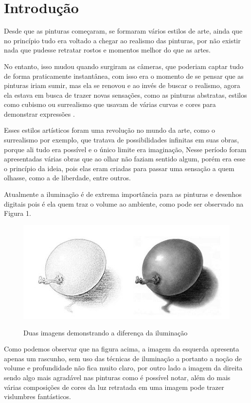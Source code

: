 \chapter {Introdução}
\label{cap:01}

Desde que as pinturas começaram, se formaram vários estilos de arte, ainda que no princípio tudo era voltado a chegar ao realismo das pinturas, por não existir nada que pudesse retratar rostos e momentos melhor do que as artes.

No entanto, isso mudou quando surgiram as câmeras, que poderiam captar tudo de forma praticamente instantânea, com isso era o momento de se pensar que as pinturas iriam sumir, mas ela se renovou e ao invés de buscar o realismo, agora ela estava em busca de trazer novas sensações, como as pinturas abstratas, estilos como cubismo ou surrealismo que usavam de várias curvas e cores para demonstrar expressões \cite{debora_2021}.

Esses estilos artísticos foram uma revolução no mundo da arte, como o surrealismo por exemplo, que tratava de possibilidades infinitas em suas obras, porque ali tudo era possível e o único limite era imaginação, Nesse período foram apresentadas várias obras que ao olhar não faziam sentido algum, porém era esse o princípio da ideia, pois elas eram criadas para passar uma sensação a quem olhasse, como a de liberdade, entre outros.

Atualmente a iluminação é de extrema importância para as  pinturas e desenhos digitais pois é ela quem traz o volume ao ambiente, como pode ser observado na Figura 1.

\begin{figure}[h]
	\caption{Duas imagens demonstrando a diferença da iluminação }
	\centering
	\includegraphics{imagens/luz-e-sombra-para-produzir-volume.jpg}

	\cite{Grafitti_2019}
\end{figure}


Como podemos observar que na figura acima, a imagem da esquerda apresenta apenas um rascunho, sem uso das técnicas de iluminação a portanto a noção de volume e profundidade não fica muito claro, por outro lado a imagem da direita sendo algo mais agradável nas pinturas como é possível notar, além do mais várias composições de cores da luz retratada em uma imagem pode trazer vislumbres fantásticos.

